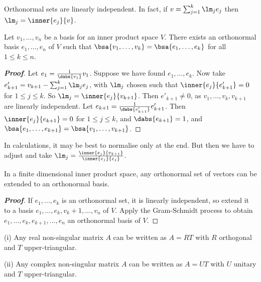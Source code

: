 \begin{lemma}
Orthonormal sets are linearly independent. In fact, if $v = \sum^k_{j=1} \lm_je_j$ then $\lm_j = \inner{e_j}{v}$.
\end{lemma}

\begin{theorem}
Let $v_1, \dots, v_n$ be a basis for an inner product space $V$. There exists an orthonormal basis $e_1, \dots, e_n$ of $V$ such that $\bsa{v_1, \dots, v_k} = \bsa{e_1, \dots, e_k}$ for all $1 \leq  k \leq  n$.
\end{theorem}

\begin{proof}[\bf Proof]
Let $e_1 = \frac 1{\dabs{v_1}} v_1$. Suppose we have found $e_1, \dots, e_k$. Now take $e'_{k+1} = v_{k+1} - \sum^k_{j=1} \lm_j e_j$, with $\lm_j$ chosen such that $\inner{e_j}{e'_{k+1}} = 0$ for $1 \leq  j \leq  k$. So $\lm_j = \inner{e_j}{v_{k+1}}$. Then $e'_{k+1} \neq 0$, as $v_1, \dots, v_k, v_{k+1}$ are linearly independent. Let $e_{k+1} = \frac 1{\dabs{e'_{k+1}}} e'_{k+1}$. Then $\inner{e_j}{e_{k+1}} = 0$ for $1 \leq  j \leq  k$, and $\dabs{e_{k+1}} = 1$, and $\bsa{e_1, \dots, e_{k+1}} = \bsa{v_1, \dots, v_{k+1}}$.
\end{proof}

\begin{remark}
In calculations, it may be best to normalise only at the end. But then we have to adjust and take $\lm_j = \frac{\inner{e_j}{v_{k+1}}}{\inner{e_j}{e_j}}$.
\end{remark}

\begin{corollary}
In a finite dimensional inner product space, any orthonormal set of vectors can be extended to an orthonormal basis.
\end{corollary}

\begin{proof}[\bf Proof]
If $e_1, \dots, e_k$ is an orthonormal set, it is linearly independent, so extend it to a basis $e_1, \dots, e_k, v_k+1, \dots, v_n$ of $V$. Apply the Gram-Schmidt process to obtain $e_1, \dots, e_k, e_{k+1}, \dots, e_n$ an orthonormal basis of $V$.
\end{proof}

\begin{corollary}
\ben
\item [(i)] Any real non-singular matrix $A$ can be written as $A = RT$ with $R$ orthogonal and $T$ upper-triangular.
\item [(ii)] Any complex non-singular matrix $A$ can be written as $A = UT$ with $U$ unitary and $T$ upper-triangular.
\een
\end{corollary}

